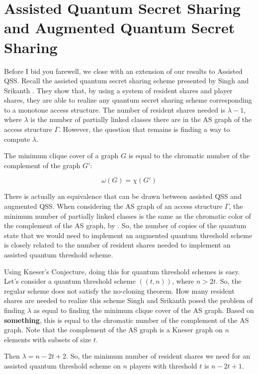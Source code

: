 \section{Assisted Quantum Secret Sharing and Augmented Quantum Secret Sharing}
\label{sec:aqss-and-aqss}

Before I bid you farewell, we close with an extension of our results to Assisted QSS. Recall the assisted quantum secret sharing scheme presented by Singh and Srikanth \cite{singh_assisted_2004}. They show that, by using a system of resident shares and player shares, they are able to realize any quantum secret sharing scheme corresponding to a monotone access structure. The number of resident shares needed is $\lambda-1$, where $\lambda$ is the number of partially linked classes there are in the AS graph of the access structure $\Gamma$. However, the question that remains is finding a way to compute $\lambda$.

\begin{theorem}
    \label{thm:chrom-clique}
    The minimum clique cover of a graph $G$ is equal to the chromatic number of the complement of the graph $G'$:
    
    \[\omega(G) = \chi(G')\]
\end{theorem}

There is actually an equivalence that can be drawn between assisted QSS and augmented QSS. When considering the AS graph of an access structure $\Gamma$, the minimum number of partially linked classes is the same as the chromatic color of the complement of the AS graph, by . So, the number of copies of the quantum state that we would need to implement an augmented quantum threshold scheme is closely related to the number of resident shares needed to implement an assisted quantum threshold scheme.

Using Kneser's Conjecture, doing this for quantum threshold schemes is easy. Let's consider a quantum threshold scheme $((t,n))$, where $n > 2t$. So, the regular scheme does not satisfy the no-cloning theorem. How many resident shares are needed to realize this scheme Singh and Srikanth posed the problem of finding $\lambda$ as equal to finding the minimum clique cover of the AS graph. Based on \textbf{something}, this is equal to the chromatic number of the complement of the AS graph. Note that the complement of the AS graph is a Kneser graph on $n$ elements with subsets of size $t$.

Then $\lambda = n-2t+2$. So, the minimum number of resident shares we need for an assisted quantum threshold scheme on $n$ players with threshold $t$ is $n-2t+1$.



